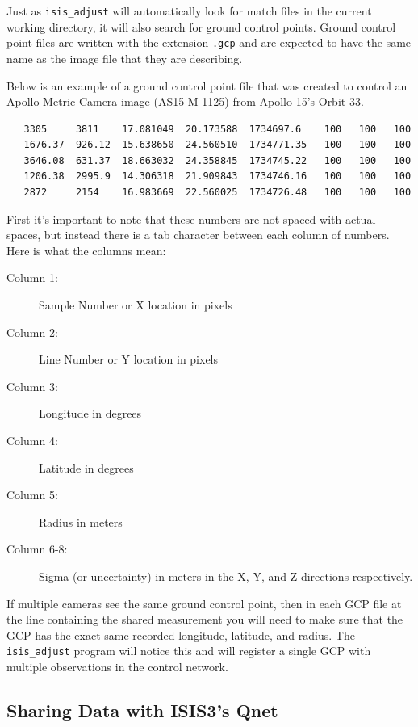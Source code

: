 Just as \texttt{isis\_adjust} will automatically look for match files
in the current working directory, it will also search for ground
control points. Ground control point files are written with the
extension \texttt{.gcp} and are expected to have the same name as the
image file that they are describing.

Below is an example of a ground control point file that was created to
control an Apollo Metric Camera image (AS15-M-1125) from Apollo 15's
Orbit 33.

\begin{verbatim}
   3305     3811    17.081049  20.173588  1734697.6    100   100   100
   1676.37  926.12  15.638650  24.560510  1734771.35   100   100   100
   3646.08  631.37  18.663032  24.358845  1734745.22   100   100   100
   1206.38  2995.9  14.306318  21.909843  1734746.16   100   100   100
   2872     2154    16.983669  22.560025  1734726.48   100   100   100
\end{verbatim}

First it's important to note that these numbers are not spaced with
actual spaces, but instead there is a tab character between each
column of numbers. Here is what the columns mean:

\begin{myindentpar}{2cm}
\begin{description}
  \item[Column 1:] Sample Number or X location in pixels
  \item[Column 2:] Line Number or Y location in pixels
  \item[Column 3:] Longitude in degrees
  \item[Column 4:] Latitude in degrees
  \item[Column 5:] Radius in meters
  \item[Column 6-8:] Sigma (or uncertainty) in meters in the X, Y,
    and Z directions respectively.
\end{description}
\end{myindentpar}

If multiple cameras see the same ground control point, then in each
GCP file at the line containing the shared measurement you will
need to make sure that the GCP has the exact same recorded longitude,
latitude, and radius. The \texttt{isis\_adjust} program will notice
this and will register a single GCP with multiple observations in
the control network.

\subsection{Sharing Data with ISIS3's Qnet}

